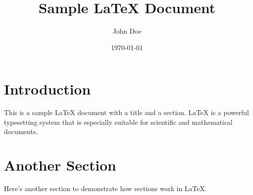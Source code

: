 \documentclass{article}
\title{Sample LaTeX Document}
\author{John Doe}
\date{\today}
\begin{document}
\maketitle
\section{Introduction}
This is a sample LaTeX document with a title and a section. LaTeX is a powerful typesetting system that is especially suitable for scientific and mathematical documents.

\section{Another Section}
Here's another section to demonstrate how sections work in LaTeX.
\end{document}
